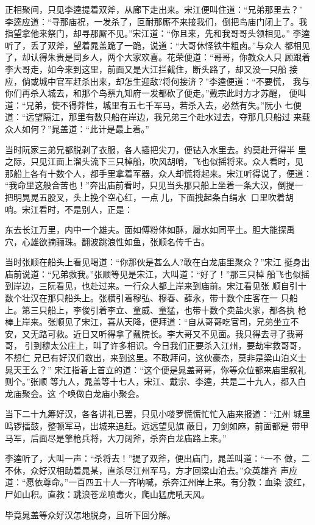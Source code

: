 正相聚间，只见李逵提着双斧，从廊下走出来。宋江便叫住道：“兄弟那里去？”
李逵应道：“寻那庙祝，一发杀了，叵耐那厮不来接我们，倒把鸟庙门闭上了。我
指望拿他来祭门，却寻那厮不见。”宋江道：“你且来，先和我哥哥头领相见。”
李逵听了，丢了双斧，望着晁盖跪了一跪，说道：“大哥休怪铁牛粗卤。”与众人
都相见了，却认得朱贵是同乡人，两个大家欢喜。花荣便道：“哥哥，你教众人只
顾跟着李大哥走，如今来到这里，前面又是大江拦截住，断头路了，却又没一只船
接应，倘或城中官军赶杀出来，却怎生迎敌?将何接济？”李逵便道：“不要慌，
我与你们再杀入城去，和那个鸟蔡九知府一发都砍了便走。”戴宗此时方才苏醒，
便叫道：“兄弟，使不得莽性，城里有五七千军马，若杀入去，必然有失。”阮小
七便道：“远望隔江，那里有数只船在岸边，我兄弟三个赴水过去，夺那几只船过
来载众人如何？”晁盖道：“此计是最上着。”

当时阮家三弟兄都脱剥了衣服，各人插把尖刀，便钻入水里去。约莫赴开得半
里之际，只见江面上溜头流下三只棹船，吹风胡哨，飞也似摇将来。众人看时，见
那船上各有十数个人，都手里拿着军器，众人却慌将起来。宋江听得说了，便道：
“我命里这般合苦也！”奔出庙前看时，只见当头那只船上坐着一条大汉，倒提一
把明晃晃五股叉，头上挽个空心红，一点儿，下面拽起条白绢水，口里吹着胡
哨。宋江看时，不是别人，正是：

东去长江万里，内中一个雄夫。面如傅粉体如酥，履水如同平土。胆大能探禹
穴，心雄欲摘骊珠。翻波跳浪性如鱼，张顺名传千古。

当时张顺在船头上看见喝道：“你那伙是甚么人?敢在白龙庙里聚众？”宋江
挺身出庙前说道：“兄弟救我。”张顺等见是宋江，大叫道：“好了！”那三只棹
船飞也似摇到岸边，三阮看见，也赴过来。一行众人都上岸来到庙前。宋江看见张
顺自引十数个壮汉在那只船头上。张横引着穆弘、穆春、薛永，带十数个庄客在一
只船上。第三只船上，李俊引着李立、童威、童猛，也带十数个卖盐火家，都各执
枪棒上岸来。张顺见了宋江，喜从天降，便拜道：“自从哥哥吃官司，兄弟坐立不
安，又无路可救。近日又听得拿了戴院长。李大哥又不见面。我只得去寻了我哥哥，
引到穆太公庄上，叫了许多相识。今日我们正要杀入江州，要劫牢救哥哥，不想仁
兄已有好汉们救出，来到这里。不敢拜问，这伙豪杰，莫非是梁山泊义士晁天王么？”
宋江指着上首立的道：“这个便是晁盖哥哥，你等众位都来庙里叙礼则个。”张顺
等九人，晁盖等十七人，宋江、戴宗、李逵，共是二十九人，都入白龙庙聚会。这
个唤做白龙庙小聚会。

当下二十九筹好汉，各各讲礼已罢，只见小喽罗慌慌忙忙入庙来报道：“江州
城里鸣锣擂鼓，整顿军马，出城来追赶。远远望见旗蔽日，刀剑如麻，前面都是
带甲马军，后面尽是擎枪兵将，大刀阔斧，杀奔白龙庙路上来。”

李逵听了，大叫一声：“杀将去！”提了双斧，便出庙门，晁盖叫道：“一不
做，二不休，众好汉相助着晁某，直杀尽江州军马，方才回梁山泊去。”众英雄齐
声应道：“愿依尊命。”一百四五十人一齐呐喊，杀奔江州岸上来。有分教：血染
波红，尸如山积。直教：跳浪苍龙喷毒火，爬山猛虎吼天风。

毕竟晁盖等众好汉怎地脱身，且听下回分解。